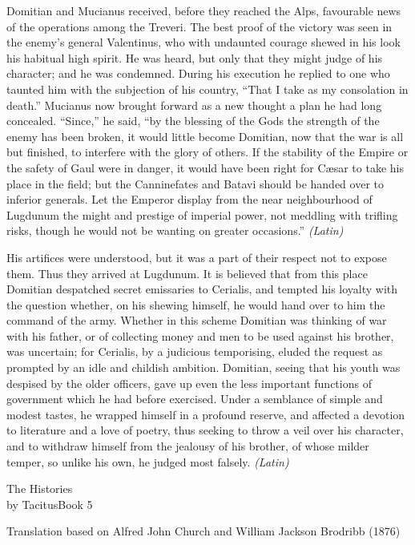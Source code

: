 Domitian and Mucianus received, before they reached the Alps, favourable news of the operations among the Treveri. The best proof of the victory was seen in the enemy's general Valentinus, who with undaunted courage shewed in his look his habitual high spirit. He was heard, but only that they might judge of his character; and he was condemned. During his execution he replied to one who taunted him with the subjection of his country, ``That I take as my consolation in death.'' Mucianus now brought forward as a new thought a plan he had long concealed. ``Since,'' he said, ``by the blessing of the Gods the strength of the enemy has been broken, it would little become Domitian, now that the war is all but finished, to interfere with the glory of others. If the stability of the Empire or the safety of Gaul were in danger, it would have been right for Cæsar to take his place in the field; but the Canninefates and Batavi should be handed over to inferior generals. Let the Emperor display from the near neighbourhood of Lugdunum the might and prestige of imperial power, not meddling with trifling risks, though he would not be wanting on greater occasions.'' \emph{(Latin)}


His artifices were understood, but it was a part of their respect not to expose them. Thus they arrived at Lugdunum. It is believed that from this place Domitian despatched secret emissaries to Cerialis, and tempted his loyalty with the question whether, on his shewing himself, he would hand over to him the command of the army. Whether in this scheme Domitian was thinking of war with his father, or of collecting money and men to be used against his brother, was uncertain; for Cerialis, by a judicious temporising, eluded the request as prompted by an idle and childish ambition. Domitian, seeing that his youth was despised by the older officers, gave up even the less important functions of government which he had before exercised. Under a semblance of simple and modest tastes, he wrapped himself in a profound reserve, and affected a devotion to literature and a love of poetry, thus seeking to throw a veil over his character, and to withdraw himself from the jealousy of his brother, of whose milder temper, so unlike his own, he judged most falsely. \emph{(Latin)}


The Histories\\
by TacitusBook 5

Translation based on Alfred John Church and William Jackson Brodribb (1876)

